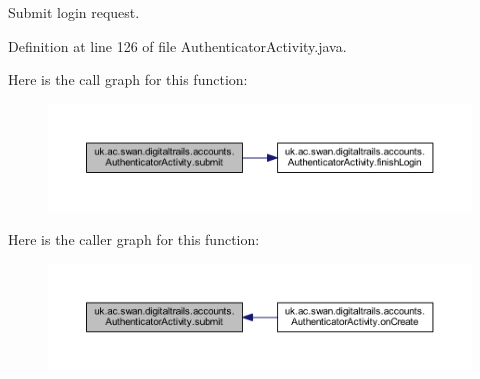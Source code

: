 Submit login request. 



Definition at line 126 of file Authenticator\+Activity.\+java.



Here is the call graph for this function\+:
\nopagebreak
\begin{figure}[H]
\begin{center}
\leavevmode
\includegraphics[width=350pt]{classuk_1_1ac_1_1swan_1_1digitaltrails_1_1accounts_1_1_authenticator_activity_a771eb6c281eece044fa2884364472850_cgraph}
\end{center}
\end{figure}




Here is the caller graph for this function\+:\nopagebreak
\begin{figure}[H]
\begin{center}
\leavevmode
\includegraphics[width=350pt]{classuk_1_1ac_1_1swan_1_1digitaltrails_1_1accounts_1_1_authenticator_activity_a771eb6c281eece044fa2884364472850_icgraph}
\end{center}
\end{figure}





